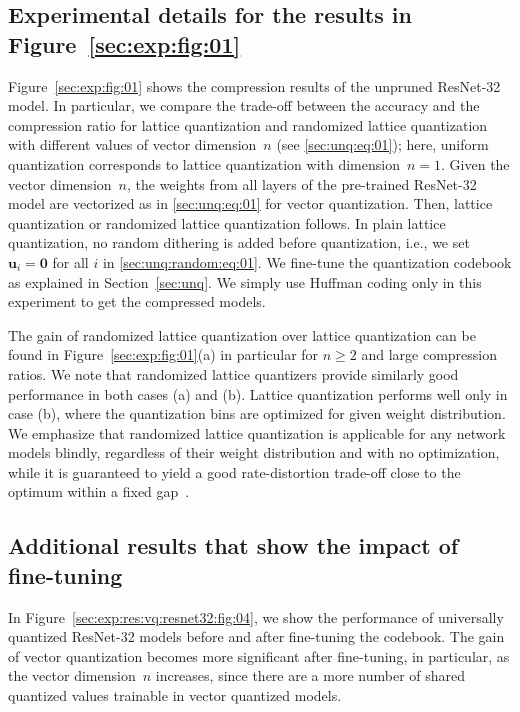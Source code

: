 \documentclass{article}
\theoremstyle{remark}
\begin{document}
\subsection{Experimental details for the results in Figure~\ref{sec:exp:fig:01}}

Figure~\ref{sec:exp:fig:01} shows the compression results of the unpruned ResNet-32 model. In particular, we compare the trade-off between the accuracy and the compression ratio for lattice quantization and randomized lattice quantization with different values of vector dimension~$n$ (see \eqref{sec:unq:eq:01}); here, uniform quantization corresponds to lattice quantization with dimension~$n=1$. Given the vector dimension~$n$, the weights from all layers of the pre-trained ResNet-32 model are vectorized as in \eqref{sec:unq:eq:01} for vector quantization. Then, lattice quantization or randomized lattice quantization follows. In plain lattice quantization, no random dithering is added before quantization, i.e., we set $\mathbf{u}_i=\mathbf{0}$ for all $i$ in \eqref{sec:unq:random:eq:01}. We fine-tune the quantization codebook as explained in Section~\ref{sec:unq}. We simply use Huffman coding only in this experiment to get the compressed models. %

The gain of randomized lattice quantization over lattice quantization can be found in Figure~\ref{sec:exp:fig:01}(a) in particular for $n\geq2$ and large compression ratios. We note that randomized lattice quantizers provide similarly good performance in both cases (a) and (b). Lattice quantization performs well only in case (b), where the quantization bins are optimized for given weight distribution. We emphasize that randomized lattice quantization is applicable for any network models blindly, regardless of their weight distribution and with no optimization, while it is guaranteed to yield a good rate-distortion trade-off close to the optimum within a fixed gap~\cite{ziv1985universal}.

\subsection{Additional results that show the impact of fine-tuning}

In Figure~\ref{sec:exp:res:vq:resnet32:fig:04}, we show the performance of universally quantized ResNet-32 models before and after fine-tuning the codebook. The gain of vector quantization becomes more significant after fine-tuning, in particular, as the vector dimension~$n$ increases, since there are a more number of shared quantized values trainable in vector quantized models.
\end{document}
